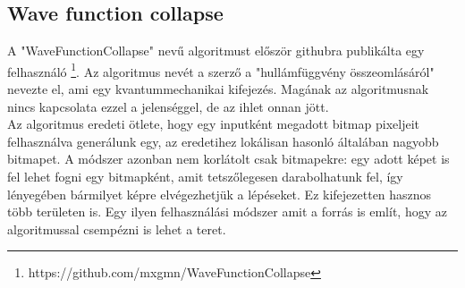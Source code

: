 \subsection{Wave function collapse}
A "WaveFunctionCollapse" nevű algoritmust először githubra publikálta egy felhasználó \footnote{https://github.com/mxgmn/WaveFunctionCollapse}. Az algoritmus nevét a szerző a "hullámfüggvény összeomlásáról" nevezte el, ami egy kvantummechanikai kifejezés. Magának az algoritmusnak nincs kapcsolata ezzel a jelenséggel, de az ihlet onnan jött.
\\Az algoritmus eredeti ötlete, hogy egy inputként megadott bitmap pixeljeit felhasználva generálunk egy, az eredetihez lokálisan hasonló általában nagyobb bitmapet. A módszer azonban nem korlátolt csak bitmapekre: egy adott képet is fel lehet fogni egy bitmapként, amit tetszőlegesen darabolhatunk fel, így lényegében bármilyet képre elvégezhetjük a lépéseket. Ez kifejezetten hasznos több területen is. Egy ilyen felhasználási módszer amit a forrás is említ, hogy az algoritmussal csempézni is lehet a teret.
